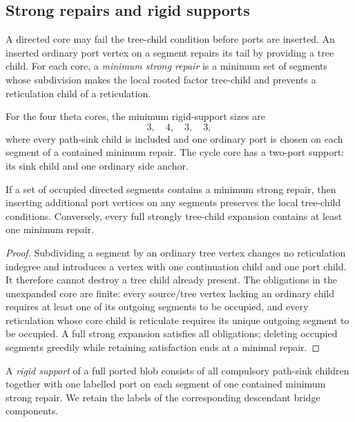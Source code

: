 \subsection{Strong repairs and rigid supports}

A directed core may fail the tree-child condition before ports are inserted.  An inserted ordinary port vertex on a segment repairs its tail by providing a tree child.  For each core, a \emph{minimum strong repair} is a minimum set of segments whose subdivision makes the local rooted factor tree-child and prevents a reticulation child of a reticulation.

For the four theta cores, the minimum rigid-support sizes are
\begin{equation}\label{eq:support-sizes}
3,\quad4,\quad3,\quad3,
\end{equation}
where every path-sink child is included and one ordinary port is chosen on each segment of a contained minimum repair.  The cycle core has a two-port support: its sink child and one ordinary side anchor.

\begin{lemma}\label{lem:occupancy}
If a set of occupied directed segments contains a minimum strong repair, then inserting additional port vertices on any segments preserves the local tree-child conditions.  Conversely, every full strongly tree-child expansion contains at least one minimum repair.
\end{lemma}

\begin{proof}
Subdividing a segment by an ordinary tree vertex changes no reticulation indegree and introduces a vertex with one continuation child and one port child.  It therefore cannot destroy a tree child already present.  The obligations in the unexpanded core are finite: every source/tree vertex lacking an ordinary child requires at least one of its outgoing segments to be occupied, and every reticulation whose core child is reticulate requires its unique outgoing segment to be occupied.  A full strong expansion satisfies all obligations; deleting occupied segments greedily while retaining satisfaction ends at a minimal repair.
\end{proof}

\begin{definition}
A \emph{rigid support} of a full ported blob consists of all compulsory path-sink children together with one labelled port on each segment of one contained minimum strong repair.  We retain the labels of the corresponding descendant bridge components.
\end{definition}

